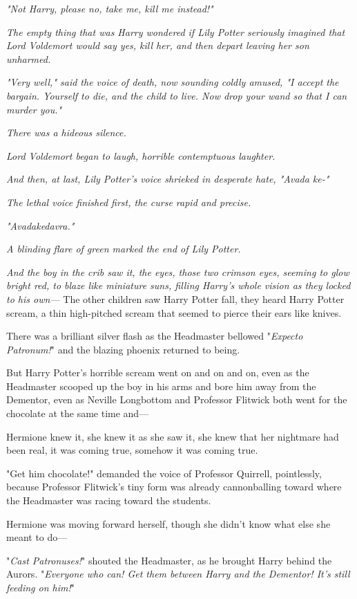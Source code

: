 \emph{"Not Harry, please no, take me, kill me instead!"}

\emph{The empty thing that was Harry wondered if Lily Potter seriously imagined 
that Lord Voldemort would say yes, kill her, and then depart leaving her son 
unharmed.}

\emph{"Very well," said the voice of death, now sounding coldly amused, "I 
accept the bargain. Yourself to die, and the child to live. Now drop your wand 
so that I can murder you."}

\emph{There was a hideous silence.}

\emph{Lord Voldemort began to laugh, horrible contemptuous laughter.}

\emph{And then, at last, Lily Potter's voice shrieked in desperate hate, "Avada 
ke-"}

\emph{The lethal voice finished first, the curse rapid and precise.}

\emph{"Avadakedavra."}

\emph{A blinding flare of green marked the end of Lily Potter.}

\emph{And the boy in the crib saw it, the eyes, those two crimson eyes, seeming 
to glow bright red, to blaze like miniature suns, filling Harry's whole vision 
as they locked to his own---}
\sbreak
The other children saw Harry Potter fall, they heard Harry Potter scream, a 
thin high-pitched scream that seemed to pierce their ears like knives.

There was a brilliant silver flash as the Headmaster bellowed "\emph{Expecto 
Patronum!}" and the blazing phoenix returned to being.

But Harry Potter's horrible scream went on and on and on, even as the 
Headmaster scooped up the boy in his arms and bore him away from the Dementor, 
even as Neville Longbottom and Professor Flitwick both went for the chocolate 
at the same time and---

Hermione knew it, she knew it as she saw it, she knew that her nightmare had 
been real, it was coming true, somehow it was coming true.

"Get him chocolate!" demanded the voice of Professor Quirrell, pointlessly, 
because Professor Flitwick's tiny form was already cannonballing toward where 
the Headmaster was racing toward the students.

Hermione was moving forward herself, though she didn't know what else she meant 
to do---

"\emph{Cast Patronuses!}" shouted the Headmaster, as he brought Harry behind 
the Aurors. "\emph{Everyone who can! Get them between Harry and the Dementor! 
It's still feeding on him!}"

